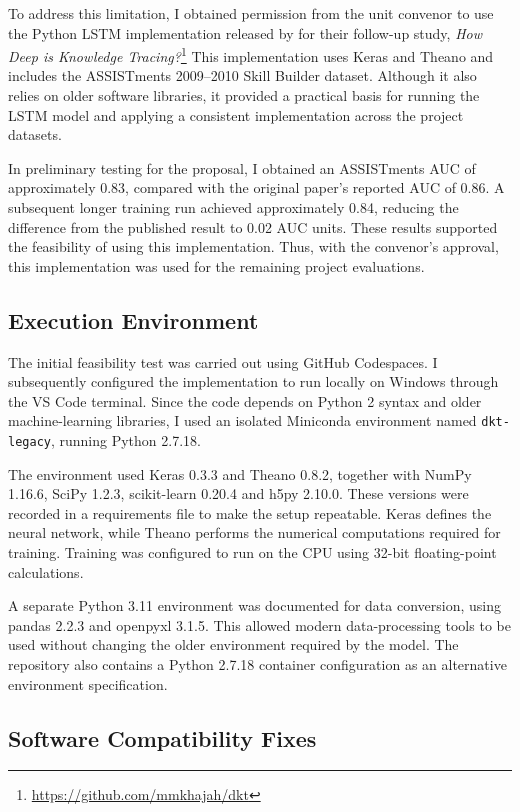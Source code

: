 \documentclass[11pt]{article}
\begin{document}
To address this limitation, I obtained permission from the unit convenor to use the Python LSTM implementation released by \citet{khajah2016deep} for their follow-up study, \textit{How Deep is Knowledge Tracing?}\footnote{\url{https://github.com/mmkhajah/dkt}} This implementation uses Keras and Theano and includes the ASSISTments 2009--2010 Skill Builder dataset. Although it also relies on older software libraries, it provided a practical basis for running the LSTM model and applying a consistent implementation across the project datasets.

In preliminary testing for the proposal, I obtained an ASSISTments AUC of approximately 0.83, compared with the original paper's reported AUC of 0.86. A subsequent longer training run achieved approximately 0.84, reducing the difference from the published result to 0.02 AUC units. These results supported the feasibility of using this implementation. Thus, with the convenor's approval, this implementation was used for the remaining project evaluations.


\subsection{Execution Environment}

The initial feasibility test was carried out using GitHub Codespaces. I subsequently configured the implementation to run locally on Windows through the VS Code terminal. Since the code depends on Python 2 syntax and older machine-learning libraries, I used an isolated Miniconda environment named \texttt{dkt-legacy}, running Python 2.7.18.

The environment used Keras 0.3.3 and Theano 0.8.2, together with NumPy 1.16.6, SciPy 1.2.3, scikit-learn 0.20.4 and h5py 2.10.0. These versions were recorded in a requirements file to make the setup repeatable. Keras defines the neural network, while Theano performs the numerical computations required for training. Training was configured to run on the CPU using 32-bit floating-point calculations.

A separate Python 3.11 environment was documented for data conversion, using pandas 2.2.3 and openpyxl 3.1.5. This allowed modern data-processing tools to be used without changing the older environment required by the model. The repository also contains a Python 2.7.18 container configuration as an alternative environment specification.

\subsection{Software Compatibility Fixes}
\end{document}
